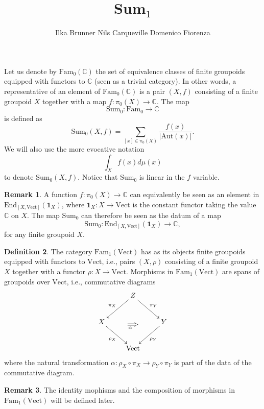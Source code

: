\documentclass[12pt]{scrartcl}
\theoremstyle{definition}
\newtheorem{definition}{Definition}
\newtheorem{remark}[definition]{Remark}
\numberwithin{equation}{section}
\numberwithin{definition}{section}
\numberwithin{figure}{section}
\begin{document}
\title{Sum${}_1$}

\author{%
\!\!\!\!\!\!\!Ilka Brunner \quad
Nils Carqueville \quad
Domenico Fiorenza \quad
}

\date{}
\maketitle



\tableofcontents



\section{}

Let us denote by $\mathrm{Fam}_0(\mathbb{C})$ the set of equivalence classes of finite groupoids equipped with functors to $\mathbb{C}$ (seen as a trivial category). In other words, a representative of an element of $\mathrm{Fam}_0(\mathbb{C})$ is a pair $(X,f)$ consisting of a finite groupoid $X$ together with a map $f\colon \pi_0(X)\to \mathbb{C}$.
The map 
\[
\mathrm{Sum}_0\colon \mathrm{Fam}_0\to \mathbb{C}
\]
is defined as
\[
\mathrm{Sum}_0(X,f)=\sum_{[x]\in \pi_0(X)}\frac{f(x)}{|\mathrm{Aut}(x)|}.
\]
We will also use the more evocative notation
\[
\int_X f(x) d\mu(x)
\]
to denote $\mathrm{Sum}_0(X,f)$. Notice that $\mathrm{Sum}_0$ is linear in the $f$ variable.
\begin{remark}
A function $f\colon \pi_0(X)\to \mathbb{C}$ can equivalently be seen as an element in $\mathrm{End}_{[X,\mathrm{Vect}]}(\mathbf{1}_X)$, where $\mathbf{1}_X\colon X\to \mathrm{Vect}$ is the constant functor taking the value $\mathbb{C}$ on $X$. The map $\mathrm{Sum}_0$ can therefore be seen as the datum of a map
\[
\mathrm{Sum}_0\colon \mathrm{End}_{[X,\mathrm{Vect}]}(\mathbf{1}_X) \to \mathbb{C},
\]
for any finite groupoid $X$.
\end{remark}

\begin{definition}
The category $\mathrm{Fam}_1(\mathrm{Vect})$ has as its objects finite groupoids equipped with functors to $\mathrm{Vect}$, i.e., pairs $(X,\rho)$ consisting of a finite groupoid $X$ together with a functor $\rho\colon X\to \mathrm{Vect}$. Morphisms in $\mathrm{Fam}_1(\mathrm{Vect})$ are spans of groupoids over $\mathrm{Vect}$, i.e., commutative diagrams
\[
\xymatrix{
&Z\ar[dl]_{\pi_X}\ar[dr]^{\pi_Y}&\\
X\ar[dr]_{\rho_X}&&Y\ar[dl]^{\rho_Y}\\
&\mathrm{Vect}
\ar@{=>}_{\alpha\phantom{m}}(13,-14);(18,-14)
}
\]
where the natural transformation $\alpha\colon \rho_X\circ \pi_X\to \rho_Y\circ \pi_Y$ is part of the data of the commutative diagram.
\end{definition}
\begin{remark}
The identity mophisms and the composition of morphisms in $\mathrm{Fam}_1(\mathrm{Vect})$ will be defined later.
\end{remark}
\end{document}
